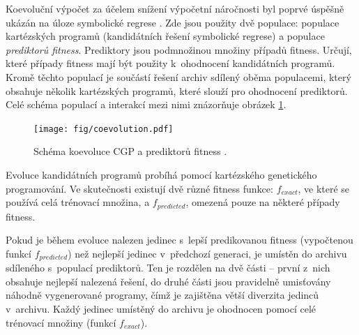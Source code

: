 Koevoluční výpočet za účelem snížení výpočetní náročnosti byl poprvé úspěšně ukázán na úloze symbolické regrese \cite{SikuEuroGP}. Zde jsou použity dvě populace: populace kartézských programů (kandidátních řešení symbolické regrese) a populace \emph{prediktorů fitness}. Prediktory jsou podmnožinou množiny případů fitness. Určují, které případy fitness mají být použity k~ohodnocení kandidátních programů. Kromě těchto populací je součástí řešení archiv sdílený oběma populacemi, který obsahuje několik kartézských programů, které slouží pro ohodnocení prediktorů. Celé schéma populací a interakcí mezi nimi znázorňuje obrázek \ref{obrKoevoluce}.

\begin{figure}[htb]
    \baselineskip
    \centering\texttt{[image: fig/coevolution.pdf]}
    \caption{Schéma koevoluce CGP a prediktorů fitness \cite{SikuEuroGP}.}
    \label{obrKoevoluce}
\end{figure}

Evoluce kandidátních programů probíhá pomocí kartézského genetického programování. Ve skutečnosti existují dvě různé fitness funkce: $f_{\mathit{exact}}$, ve které se používá celá trénovací množina, a $f_{\mathit{predicted}}$, omezená pouze na některé případy fitness.




Pokud je během evoluce nalezen jedinec s~lepší predikovanou fitness (vypočtenou funkcí $f_{\mathit{predicted}}$) než nejlepší jedinec v~předchozí generaci, je umístěn do archivu sdíleného s~populací prediktorů. Ten je rozdělen na dvě části -- první z~nich obsahuje nejlepší nalezená řešení, do druhé části jsou pravidelně umisťovány náhodně vygenerované programy, čímž je zajištěna větší diverzita jedinců v~archivu. Každý jedinec umístěný do archivu je ohodnocen pomocí celé trénovací množiny (funkcí $f_{\mathit{exact}}$).

